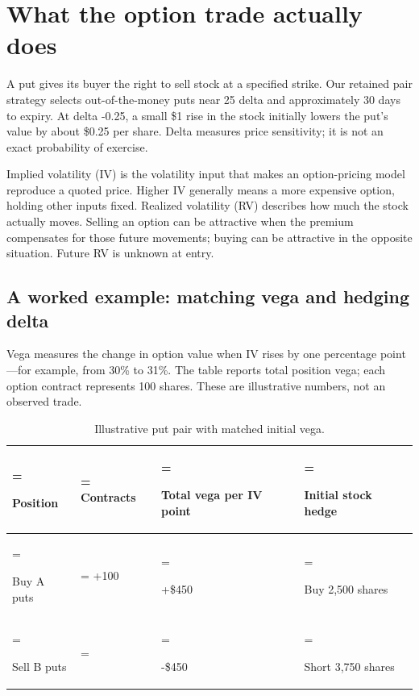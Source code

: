 \section{What the option trade actually does}\label{sec:3}

A put gives its buyer the right to sell stock at a specified strike. Our retained pair strategy selects out-of-the-money puts near 25 delta and approximately 30 days to expiry. At delta -0.25, a small \$1 rise in the stock initially lowers the put's value by about \$0.25 per share. Delta measures price sensitivity; it is not an exact probability of exercise.


Implied volatility (IV) is the volatility input that makes an option-pricing model reproduce a quoted price. Higher IV generally means a more expensive option, holding other inputs fixed. Realized volatility (RV) describes how much the stock actually moves. Selling an option can be attractive when the premium compensates for those future movements; buying can be attractive in the opposite situation. Future RV is unknown at entry.


\subsection*{A worked example: matching vega and hedging delta}

Vega measures the change in option value when IV rises by one percentage point---for example, from 30\% to 31\%. The table reports total position vega; each option contract represents 100 shares. These are illustrative numbers, not an observed trade.


\begin{table}[H]\centering\small
\caption{Illustrative put pair with matched initial vega.}
\setlength{\tabcolsep}{4pt}\renewcommand{\arraystretch}{1.18}
\begin{tabularx}{\textwidth}{@{}>{\hsize=0.84375\hsize\linewidth=\hsize\raggedright\arraybackslash}X>{\hsize=0.58594\hsize\linewidth=\hsize\raggedleft\arraybackslash}X>{\hsize=1.21094\hsize\linewidth=\hsize\raggedright\arraybackslash}X>{\hsize=1.35938\hsize\linewidth=\hsize\raggedright\arraybackslash}X@{}}\toprule
\textbf{Position} & \textbf{Contracts} & \textbf{Total vega per IV point} & \textbf{Initial stock hedge}\\\midrule
Buy A puts & +100 & +\$450 & Buy 2,500 shares\\
Sell B puts & -150 & -\$450 & Short 3,750 shares\\
\bottomrule\end{tabularx}\end{table}

